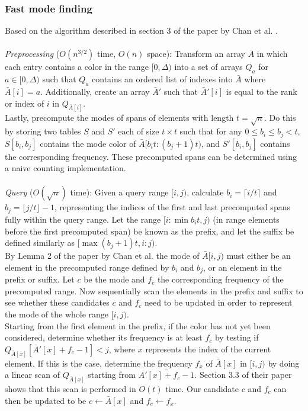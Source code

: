 \documentclass{article}
\newcommand{\fb}[1]{{\color{blue}#1}}
\begin{document}
\subsubsection{Fast mode finding}
Based on the algorithm described in section 3 of the paper by Chan et al.
\cite{Chan2014}. \\\\ 
\textit{Preprocessing} ($O(n^{3/2})$ time, $O(n)$ space): Transform an array $\bar{A}$ in
which each entry contains a color in the range $[0, \Delta)$ into a set of
arrays $Q_a$ for $a \in [0, \Delta)$ such that $Q_a$ contains an ordered list
of indexes into $\bar{A}$ where $\bar{A}[i] = a$. Additionally, create an array
$\bar{A}'$ such that $\bar{A}'[i]$ is equal to the rank or index of $i$ in
$Q_{\bar{A}[i]}$. \\ Lastly, precompute the modes of spans of elements with
length $t = \sqrt{n}$. Do this by storing two tables $S$ and $S'$ each of size
$t \times t$ such that for any $0\leq b_i \leq b_j < t$, $S[b_i, b_j]$ contains
the mode color of $\bar{A}[b_it : (b_j + 1)t)$, and $S'[b_i, b_j]$ contains the
corresponding frequency. These precomputed spans can be determined using a
naive counting implementation. \\\\ 
\textit{Query} ($O(\sqrt{n})$ time): Given a query range $[i, j)$, calculate $b_i=\lceil i/t \rceil$ and $b_j=\lfloor j/t \rfloor - 1$,
representing the indices of the first and last precomputed spans fully within
the query range. Let the range $[i : \min{b_it, j})$ (in range elements before
the first precomputed span) be known as the prefix, and let the suffix be
defined similarly as $[\max{(b_j + 1)t, i} : j)$. \\ \fb{By Lemma 2 of the paper by Chan et al.} the mode of $\bar{A}[i,
    j)$ must either be an element in the precomputed range defined by $b_i$ and
$b_j$, or an element in the prefix or suffix. Let $c$ be the mode and $f_c$ the
corresponding frequency of the precomputed range. Now sequentially scan the
elements \fb{in} the prefix and suffix to see whether these candidates $c$ and $f_c$
need to be updated in order to represent the mode of the whole range $[i, j)$.
\\ Starting from the first element in the prefix, if the color has not yet been
considered, determine whether its frequency is at least $f_c$ by testing if
$Q_{\bar{A}[x]}[\bar{A}'[x] + f_c - 1] < j$, where $x$ represents the index of
the current element. If this is the case, determine the frequency $f_x$ of
$\bar{A}[x]$ in $[i, j)$ by doing a linear scan of $Q_{\bar{A}[x]}$ \fb{starting from $\bar{A'[x] + f_c - 1}$. Section 3.3 of their paper shows that this scan is performed in $O(t)$ time}. Our
candidate $c$ and $f_c$ can then be updated to be $c \leftarrow \bar{A}[x]$ and
$f_c \leftarrow f_x$.
\end{document}
